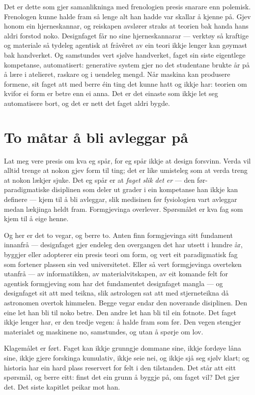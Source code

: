 Det er dette som gjer samanlikninga med frenologien presis snarare enn polemisk. Frenologen kunne halde fram så lenge alt han hadde var skallar å kjenne på. Gjev honom ein hjerneskannar, og reiskapen avslører straks at teorien bak handa hans aldri forstod noko. Designfaget får no sine hjerneskannarar — verktøy så kraftige og materiale så tydeleg agentisk at fråvêret av ein teori ikkje lenger kan gøymast bak handverket. Og samstundes vert sjølve handverket, faget sin siste eigentlege kompetanse, automatisert: generative system gjer no det studentane brukte år på å lære i atelieret, raskare og i uendeleg mengd. Når maskina kan produsere formene, sit faget att med berre éin ting det kunne hatt og ikkje har: teorien om kvifor ei form er betre enn ei anna. Det er det einaste som ikkje let seg automatisere bort, og det er nett det faget aldri bygde.

\section{To måtar å bli avleggar på}

Lat meg vere presis om kva eg spår, for eg spår ikkje at design forsvinn. Verda vil alltid trenge at nokon gjev form til ting; det er like umisteleg som at verda treng at nokon lækjer sjuke. Det eg spår er at \emph{faget slik det er} — den før-paradigmatiske disiplinen som deler ut grader i ein kompetanse han ikkje kan definere — kjem til å bli avleggar, slik medisinen før fysiologien vart avleggar medan lækjinga heldt fram. Formgjevinga overlever. Spørsmålet er kva fag som kjem til å eige henne.

Og her er det to vegar, og berre to. Anten finn formgjevinga sitt fundament innanfrå — designfaget gjer endeleg den overgangen det har utsett i hundre år, byggjer eller adopterer ein presis teori om form, og vert eit paradigmatisk fag som fortener plassen sin ved universitetet. Eller så vert formgjevinga overteken utanfrå — av informatikken, av materialvitskapen, av eit komande felt for agentisk formgjeving som har det fundamentet designfaget mangla — og designfaget sit att med teikna, slik astrologen sat att med stjerneteikna då astronomen overtok himmelen. Begge vegar endar den noverande disiplinen. Den eine let han bli til noko betre. Den andre let han bli til ein fotnote. Det faget ikkje lenger har, er den tredje vegen: å halde fram som før. Den vegen stengjer materialet og maskinene no, samstundes, og utan å spørje om lov.

\vignett

Klagemålet er ført. Faget kan ikkje grunngje dommane sine, ikkje fordøye låna sine, ikkje gjere forskinga kumulativ, ikkje seie nei, og ikkje sjå seg sjølv klart; og historia har ein hard plass reservert for felt i den tilstanden. Det står att eitt spørsmål, og berre eitt: finst det ein grunn å byggje på, om faget vil? Det gjer det. Det siste kapitlet peikar mot han.
